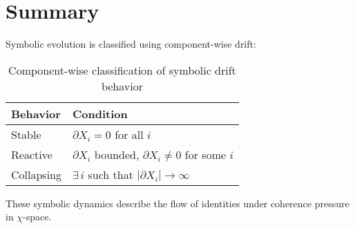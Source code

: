 \section{Summary}

Symbolic evolution is classified using component-wise drift:

\begin{table}[h!]
\centering
\begin{tabular}{|l|l|}
\hline
\textbf{Behavior} & \textbf{Condition} \\
\hline
Stable     & $\partial X_i = 0$ for all $i$ \\
Reactive   & $\partial X_i$ bounded, $\partial X_i \ne 0$ for some $i$ \\
Collapsing & $\exists\, i$ such that $|\partial X_i| \to \infty$ \\
\hline
\end{tabular}
\caption{Component-wise classification of symbolic drift behavior}
\end{table}

\medskip

These symbolic dynamics describe the flow of identities under coherence pressure in $\chi$-space.
